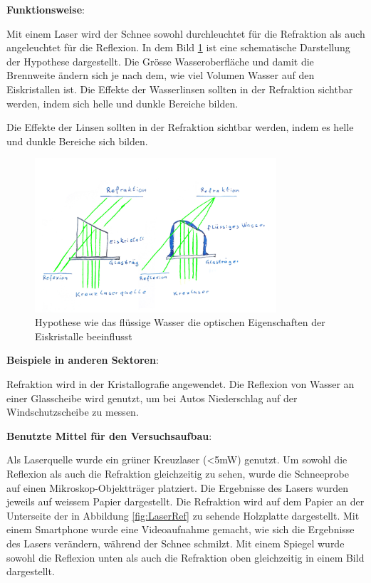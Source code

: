 

\textbf{Funktionsweise}:

Mit einem Laser wird der Schnee sowohl durchleuchtet für die Refraktion als auch angeleuchtet für die Reflexion. In dem Bild \ref{fig:LaserHypothese} ist eine schematische Darstellung der Hypothese dargestellt. Die Grösse Wasseroberfläche und damit die Brennweite ändern sich je nach dem, wie viel Volumen Wasser auf den Eiskristallen ist. Die Effekte der Wasserlinsen sollten in der Refraktion sichtbar werden, indem sich helle und dunkle Bereiche bilden.


Die Effekte der Linsen sollten in der Refraktion sichtbar werden, indem es helle und dunkle Bereiche sich bilden.


\begin{figure}
    \centering
    \includegraphics[width=0.8\textwidth]{Bilder/Reflaktion.jpeg}
    \caption{Hypothese wie das flüssige Wasser die optischen Eigenschaften der Eiskristalle beeinflusst}
    \label{fig:LaserHypothese}
\end{figure}

\textbf{Beispiele in anderen Sektoren}:

Refraktion wird in der Kristallografie angewendet. Die Reflexion von Wasser an einer Glasscheibe wird genutzt, um bei Autos Niederschlag auf der Windschutzscheibe zu messen.


\textbf{Benutzte Mittel für den Versuchsaufbau}:

Als Laserquelle wurde ein grüner Kreuzlaser (<5mW) genutzt. Um sowohl die Reflexion als auch die Refraktion gleichzeitig zu sehen, wurde die Schneeprobe auf einen Mikroskop-Objektträger platziert. Die Ergebnisse des Lasers wurden jeweils auf weissem Papier dargestellt. Die Refraktion wird auf dem Papier an der Unterseite der in Abbildung \ref{fig:LaserRef} zu sehende Holzplatte dargestellt. Mit einem Smartphone wurde eine Videoaufnahme gemacht, wie sich die Ergebnisse des Lasers verändern, während der Schnee schmilzt. Mit einem Spiegel wurde sowohl die Reflexion unten als auch die Refraktion oben gleichzeitig in einem Bild dargestellt.



